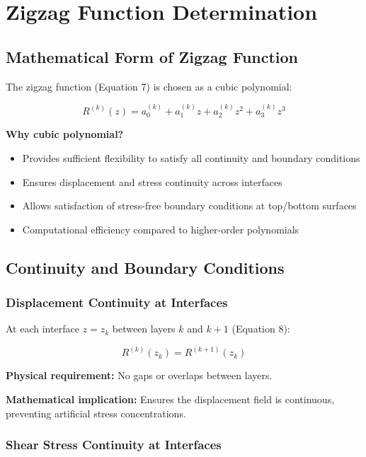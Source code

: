 \documentclass[12pt,a4paper]{article}
\begin{document}
\section{Zigzag Function Determination}

\subsection{Mathematical Form of Zigzag Function}

The zigzag function (Equation 7) is chosen as a cubic polynomial:

\begin{equation}
R^{(k)}(z) = a_0^{(k)} + a_1^{(k)} z + a_2^{(k)} z^2 + a_3^{(k)} z^3
\end{equation}

\textbf{Why cubic polynomial?}
\begin{itemize}
\item Provides sufficient flexibility to satisfy all continuity and boundary conditions
\item Ensures displacement and stress continuity across interfaces
\item Allows satisfaction of stress-free boundary conditions at top/bottom surfaces
\item Computational efficiency compared to higher-order polynomials
\end{itemize}

\subsection{Continuity and Boundary Conditions}

\subsubsection{Displacement Continuity at Interfaces}

At each interface $z = z_k$ between layers $k$ and $k+1$ (Equation 8):

\begin{equation}
R^{(k)}(z_k) = R^{(k+1)}(z_k)
\end{equation}

\textbf{Physical requirement:} No gaps or overlaps between layers.

\textbf{Mathematical implication:} Ensures the displacement field is continuous, preventing artificial stress concentrations.

\subsubsection{Shear Stress Continuity at Interfaces}
\end{document}
